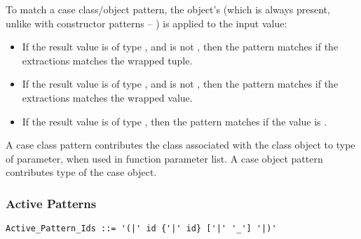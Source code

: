 To match a case class/object pattern, the object's  (which is always present, unlike with constructor patterns -- ) is applied to the input value:
\begin{itemize}
  \item If the result value is of type , and is not , then the pattern matches if the extractions matches the wrapped tuple. 
  \item If the result value is of type , and is not , then the pattern matches if the extractions matches the wrapped value. 
  \item If the result value is of type , then the pattern matches if the value is . 
\end{itemize} 

A case class pattern contributes the class associated with the class object to type of parameter, when used in function parameter list. A case object pattern contributes type of the case object. 





\subsubsection{Active Patterns}
\label{sec:active-patterns}

\grammar\begin{lstlisting}
Active_Pattern_Ids ::= '(|' id {'|' id} ['|' '_'] '|)'
\end{lstlisting}

